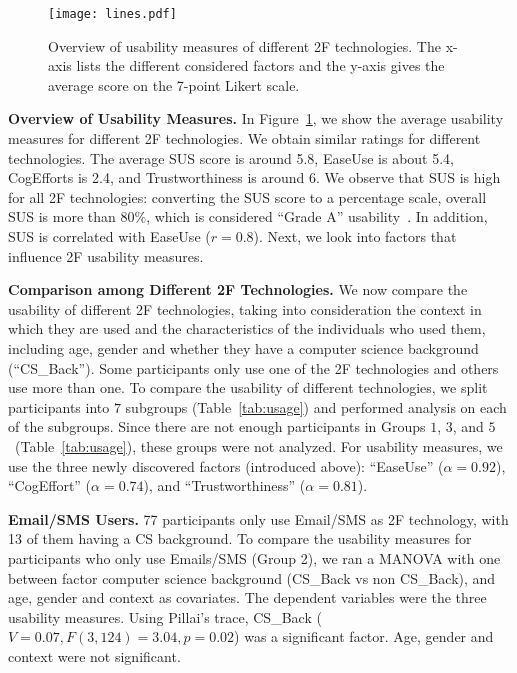 \documentclass[conference]{IEEEtran}
\newcommand{\descr}[1]{\vspace{0.25cm} \noindent \textbf{#1}}
\begin{document}
\begin{figure}[ttt]
\centering
  \texttt{[image: lines.pdf]}
\caption{Overview of usability measures of different 2F technologies. The x-axis lists the different considered factors and the y-axis gives the average score on the 7-point Likert scale. }
  \label{fig:overview} 
\end{figure}


\descr{Overview of Usability Measures.} In Figure~\ref{fig:overview}, we show the average usability measures for different 2F technologies. We obtain similar ratings for different technologies. The average SUS score is around 5.8, EaseUse is about 5.4, CogEfforts is 2.4, and Trustworthiness is around 6. We observe that SUS is high for all 2F technologies: converting the SUS score to a percentage scale, overall SUS is more than $80\%$, which is considered ``Grade A'' usability~\cite{sauro2012quantifying}. In addition, SUS is correlated with EaseUse ($r=0.8$). 
Next, we look into factors that influence 2F usability measures. 

\descr{Comparison among Different 2F Technologies.} We now compare the usability of different 2F technologies, taking into consideration the context in which they are used and the characteristics of the individuals who used them, including age, gender and whether they have a computer science background (``CS\_Back''). Some participants only use one of the 2F technologies and others use more than one. To compare the usability of different technologies, we split participants into $7$ subgroups (Table~\ref{tab:usage}) and performed analysis on each of the subgroups. Since there are not enough participants in Groups $1$, $3$, and $5$~(Table~\ref{tab:usage}), these groups were not analyzed. For usability measures, we use the three newly  discovered factors (introduced above): ``EaseUse'' ($\alpha = 0.92$), ``CogEffort'' ($\alpha = 0.74$), and ``Trustworthiness'' ($\alpha = 0.81$).

\descr{Email/SMS Users.}
77 participants only use Email/SMS as 2F technology, with 13 of them having a CS background. To compare the usability measures for participants who only use Emails/SMS (Group 2), we ran a MANOVA with one between factor computer science background (CS\_Back vs non CS\_Back), and age, gender and context as covariates. The dependent variables were the three usability measures. Using Pillai's trace, CS\_Back  ($V= 0.07, F(3,124)=3.04, p=0.02$) was a significant factor. Age, gender and context were not significant.
\end{document}
